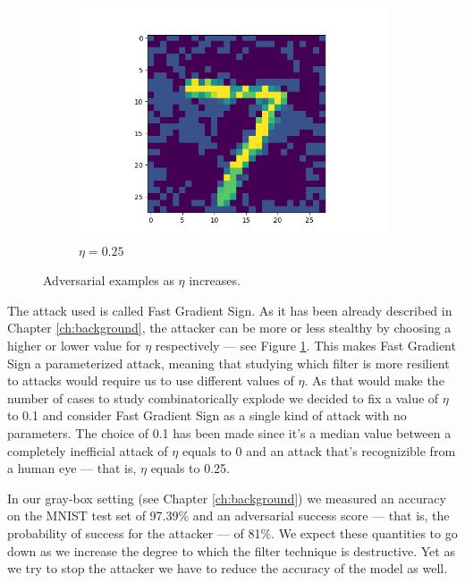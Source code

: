 \begin{figure}
  \begin{subfigure}{0.3\linewidth}
    \includegraphics[width=\linewidth]{adversarial-input-fc-100-100-10-025.png}
    \caption{$\eta = 0.25$}
  \end{subfigure}
  \caption{Adversarial examples as $\eta$ increases.}
  \label{fig:fgs-increasing-eta}
\end{figure}

The attack used is called Fast Gradient Sign. As it has been already
described in Chapter \ref{ch:background}, the attacker can be more or
less stealthy by choosing a higher or lower value for $\eta$
respectively --- see Figure \ref{fig:fgs-increasing-eta}. This makes
Fast Gradient Sign a parameterized attack, meaning that studying which
filter is more resilient to attacks would require us to use different
values of $\eta$. As that would make the number of cases to study
combinatorically explode we decided to fix a value of $\eta$ to 0.1 and
consider Fast Gradient Sign as a single kind of attack with no
parameters. The choice of 0.1 has been made since it's a median value
between a completely inefficial attack of $\eta$ equals to 0 and an
attack that's recognizible from a human eye --- that is, $\eta$ equals
to 0.25.

In our gray-box setting (see Chapter \ref{ch:background}) we measured
an accuracy on the MNIST test set of 97.39\% and an adversarial success
score --- that is, the probability of success for the attacker --- of
81\%. We expect these quantities to go down as we increase the degree
to which the filter technique is destructive. Yet as we try to stop the
attacker we have to reduce the accuracy of the model as well.

